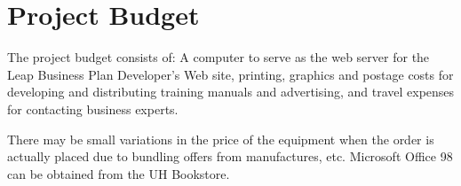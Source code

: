 
\section{Project Budget}

The project budget consists of: A computer to serve as the web server for
the Leap Business Plan Developer's Web site, printing, graphics and postage
costs for developing and distributing training manuals and advertising, and
travel expenses for contacting business experts.

There may be small variations in the price of the equipment when the order
is actually placed due to bundling offers from manufactures, etc. Microsoft
Office 98 can be obtained from the UH Bookstore.

\vspace{1 in}


